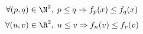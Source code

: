 \begin{displaymath}
 \forall(p,q)\in \N^2,\;p\leq q \Rightarrow f_p(x) \leq f_q(x)
\end{displaymath}
\begin{displaymath}
 \forall(u,v)\in \R^2,\;u\leq v \Rightarrow f_n(v) \leq f_v(v)
\end{displaymath}
